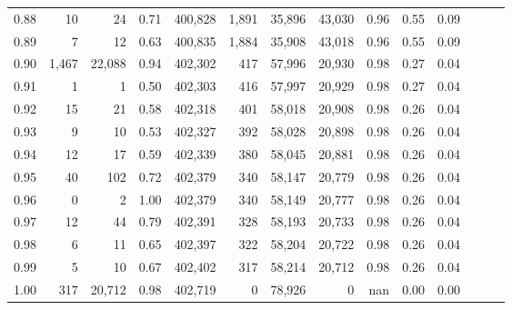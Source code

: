 \begin{tabular}{rrrrrrrrrrrrrr}
0.88 &      10 &      24 &  0.71 &  400,828 &    1,891 &  35,896 &  43,030 &  0.96 &  0.55 &      0.09 \\
0.89 &       7 &      12 &  0.63 &  400,835 &    1,884 &  35,908 &  43,018 &  0.96 &  0.55 &      0.09 \\
0.90 &   1,467 &  22,088 &  0.94 &  402,302 &      417 &  57,996 &  20,930 &  0.98 &  0.27 &      0.04 \\
0.91 &       1 &       1 &  0.50 &  402,303 &      416 &  57,997 &  20,929 &  0.98 &  0.27 &      0.04 \\
0.92 &      15 &      21 &  0.58 &  402,318 &      401 &  58,018 &  20,908 &  0.98 &  0.26 &      0.04 \\
0.93 &       9 &      10 &  0.53 &  402,327 &      392 &  58,028 &  20,898 &  0.98 &  0.26 &      0.04 \\
0.94 &      12 &      17 &  0.59 &  402,339 &      380 &  58,045 &  20,881 &  0.98 &  0.26 &      0.04 \\
0.95 &      40 &     102 &  0.72 &  402,379 &      340 &  58,147 &  20,779 &  0.98 &  0.26 &      0.04 \\
0.96 &       0 &       2 &  1.00 &  402,379 &      340 &  58,149 &  20,777 &  0.98 &  0.26 &      0.04 \\
0.97 &      12 &      44 &  0.79 &  402,391 &      328 &  58,193 &  20,733 &  0.98 &  0.26 &      0.04 \\
0.98 &       6 &      11 &  0.65 &  402,397 &      322 &  58,204 &  20,722 &  0.98 &  0.26 &      0.04 \\
0.99 &       5 &      10 &  0.67 &  402,402 &      317 &  58,214 &  20,712 &  0.98 &  0.26 &      0.04 \\
1.00 &     317 &  20,712 &  0.98 &  402,719 &        0 &  78,926 &       0 &   nan &  0.00 &      0.00 \\
\bottomrule
\end{tabular}

